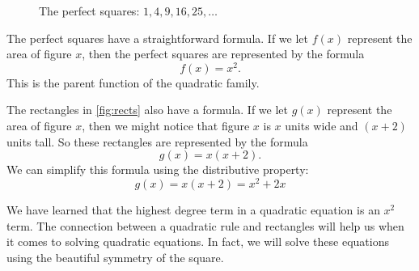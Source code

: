 \begin{figure}[!htbp]
\centering
{}
\caption{The perfect squares: $1, 4, 9, 16, 25, \dotsc$}
\label{fig:squares}
\end{figure}

The perfect squares have a straightforward formula. If we let $f(x)$ represent the area of figure $x$, then the perfect squares are represented by the formula
\[f(x)=x^2.\]
This is the parent function of the quadratic family.

The rectangles in \cref{fig:rects} also have a formula. If we let $g(x)$ represent the area of figure $x$, then we might notice that figure $x$ is $x$ units wide and $(x+2)$ units tall. So these rectangles are represented by the formula
\[g(x) = x(x+2).\]
We can simplify this formula using the distributive property:
\[g(x) = x(x+2) = x^2 + 2x\]

We have learned that the highest degree term in a quadratic equation is an $x^2$ term. The connection between a quadratic rule and rectangles will help us when it comes to solving quadratic equations. In fact, we will solve these equations using the beautiful symmetry of the square.

